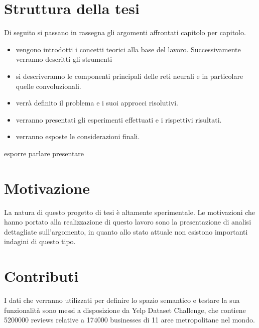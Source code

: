\section*{Struttura della tesi}
{\color{green}Di seguito si passano in rassegna gli argomenti affrontati capitolo per capitolo.

\begin{itemize}
	\item [\setfont{\bfseries Nel  capitolo \nameref{chap:contesto}}] vengono introdotti i concetti teorici alla base del lavoro. Successivamente verranno descritti gli strumenti 
	\item [\setfont{\bfseries Nel capitolo \nameref{chap:RetiNeurali}}] si descriveranno le componenti principali delle reti neurali e in particolare quelle convoluzionali. 
	\item [\setfont{\bfseries Nel capitolo \nameref{chap:formulazione}}] verrà definito il problema e i suoi approcci risolutivi.
	\item [\setfont{\bfseries Nel capitolo \nameref{chap:esperimenti}}] verranno presentati gli esperimenti effettuati e i rispettivi risultati.
	\item [\setfont{\bfseries Nel capitolo \nameref{chap:conclusioni}}] verranno esposte le considerazioni finali.
\end{itemize}
esporre
parlare
presentare

\section*{Motivazione}
\label{sec:motivazione}

La natura di questo progetto di tesi è altamente sperimentale. Le motivazioni che hanno portato alla realizzazione di questo lavoro sono la presentazione di analisi dettagliate sull'argomento, in quanto allo stato attuale non esistono importanti indagini di questo tipo.

\section*{Contributi}
\label{sec:contributi}

I dati che verranno utilizzati per definire lo spazio semantico e testare la sua funzionalità sono messi a disposizione da Yelp Dataset Challenge, che contiene 5200000 reviews relative a 174000 businesses di 11 aree metropolitane nel mondo. 
}